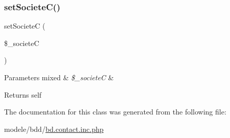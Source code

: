 \subsubsection{\texorpdfstring{set\+Societe\+C()}{setSocieteC()}}
{\footnotesize\ttfamily set\+SocieteC (\begin{DoxyParamCaption}\item[{}]{\$\+\_\+societeC }\end{DoxyParamCaption})}


\begin{DoxyParams}[1]{Parameters}
mixed & {\em \$\+\_\+societeC} & \\
\hline
\end{DoxyParams}
\begin{DoxyReturn}{Returns}
self 
\end{DoxyReturn}


The documentation for this class was generated from the following file\+:\begin{DoxyCompactItemize}
\item 
modele/bdd/\hyperlink{bd_8contact_8inc_8php}{bd.\+contact.\+inc.\+php}\end{DoxyCompactItemize}
